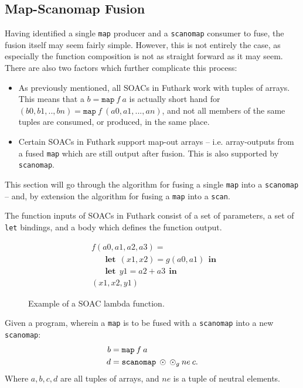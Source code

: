 \documentclass[11pt,bibliography=totocnumbered]{article}
\newcommand\lett{\phantom{-}\:\:\mathbf{let}\:\:}
\newcommand\inn{\:\:\mathbf{in}\:\:}
\begin{document}
\subsection{Map-Scanomap Fusion}\label{sec:mapscanomapfus}
\setcounter{equation}{0}
Having identified a single \texttt{map} producer and a \texttt{scanomap} consumer to fuse, the fusion itself may seem fairly simple.
 However, this is not entirely the case, as especially the function composition is not as straight forward as it may seem. There are also two factors
 which further complicate this process:
 \begin{itemize}
 \item As previously mentioned, all SOACs in Futhark work with tuples of arrays. This means that a $b = \mathtt{map}\: f \: a$ is actually short hand for
$(b0, b1, .. ,bn) = \mathtt{map} \: f \: (a0, a1, ..., an)$, and not all members of the same tuples are consumed, or produced, in the same place.
 \item Certain SOACs in Futhark support map-out arrays -- i.e. array-outputs from a fused \texttt{map} which are still output after fusion. This is also
 supported by \texttt{scanomap}. 
 \end{itemize}
This section will go through the algorithm for fusing a single \texttt{map} into a \texttt{scanomap} -- and, by extension the algorithm for fusing a \texttt{map} into a \texttt{scan}.

The function inputs of SOACs in Futhark consist of a set of parameters, a set of \texttt{let} bindings, and a body which defines the function output. 
\begin{figure}[h!]
  \centering
  \begin{align}
    &f (a0, a1, a2, a3) = \\
    &\lett (x1,x2) = g(a0, a1) \inn \\
    &\lett y1 = a2 + a3 \inn \\
    &(x1, x2, y1)
  \end{align}
  \caption{Example of a SOAC lambda function.}
\end{figure}
 Given a program, wherein a \texttt{map} is to be fused with a \texttt{scanomap} into a new \texttt{scanomap}:
\begin{align*}
b &= \mathtt{map} \: f \: a \\
d &= \mathtt{scanomap} \: \odot \: \odot_g \: ne \: c \mathnormal{.}  
\end{align*}
Where $a, b, c, d$ are all tuples of arrays, and $ne$ is a tuple of neutral elements.
\end{document}
